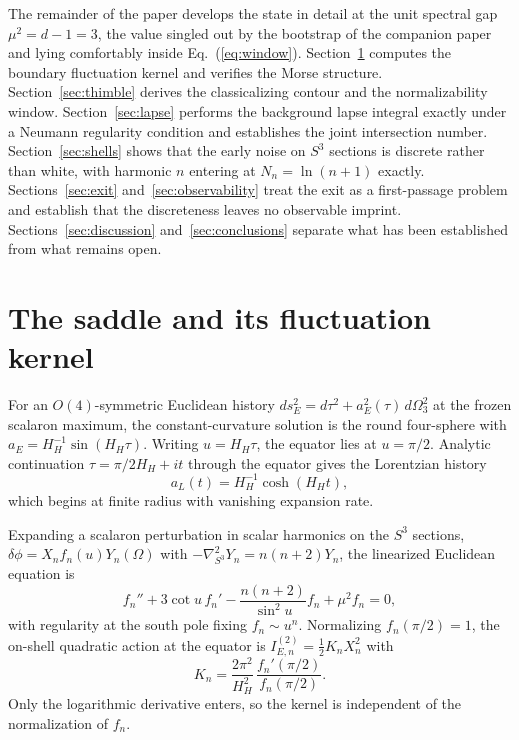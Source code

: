\documentclass[aps,prd,twocolumn,superscriptaddress,nofootinbib,longbibliography]{revtex4-2}
\begin{document}
The remainder of the paper develops the state in detail at the unit spectral
gap $\mu^2=d-1=3$, the value singled out by the bootstrap of the companion
paper and lying comfortably inside Eq.~(\ref{eq:window}).
Section~\ref{sec:kernel} computes the boundary fluctuation kernel and
verifies the Morse structure. Section~\ref{sec:thimble} derives the
classicalizing contour and the normalizability window.
Section~\ref{sec:lapse} performs the background lapse integral exactly under
a Neumann regularity condition and establishes the joint intersection
number. Section~\ref{sec:shells} shows that the early noise on $S^3$ sections
is discrete rather than white, with harmonic $n$ entering at
$N_n=\ln(n+1)$ exactly. Sections~\ref{sec:exit} and~\ref{sec:observability}
treat the exit as a first-passage problem and establish that the discreteness
leaves no observable imprint. Sections~\ref{sec:discussion}
and~\ref{sec:conclusions} separate what has been established from what
remains open.

\section{The saddle and its fluctuation kernel}
\label{sec:kernel}
For an $O(4)$-symmetric Euclidean history
$ds_E^2=d\tau^2+a_E^2(\tau)\,d\Omega_3^2$ at the frozen scalaron maximum, the
constant-curvature solution is the round four-sphere with
$a_E=H_H^{-1}\sin(H_H\tau)$. Writing $u=H_H\tau$, the equator lies at
$u=\pi/2$. Analytic continuation $\tau=\pi/2H_H+it$ through the equator
gives the Lorentzian history
\begin{equation}
a_L(t)=H_H^{-1}\cosh(H_Ht),
\end{equation}
which begins at finite radius with vanishing expansion rate.

Expanding a scalaron perturbation in scalar harmonics on the $S^3$ sections,
$\delta\phi=X_nf_n(u)Y_n(\Omega)$ with
$-\nabla^2_{S^3}Y_n=n(n+2)Y_n$, the linearized Euclidean equation is
\begin{equation}
f_n''+3\cot u\,f_n'-\frac{n(n+2)}{\sin^2u}f_n+\mu^2f_n=0,
\label{eq:euclid}
\end{equation}
with regularity at the south pole fixing $f_n\sim u^n$. Normalizing
$f_n(\pi/2)=1$, the on-shell quadratic action at the equator is
$I^{(2)}_{E,n}=\tfrac12K_nX_n^2$ with
\begin{equation}
K_n=\frac{2\pi^2}{H_H^2}\,\frac{f_n'(\pi/2)}{f_n(\pi/2)} .
\label{eq:kernel}
\end{equation}
Only the logarithmic derivative enters, so the kernel is independent of the
normalization of $f_n$.
\end{document}
